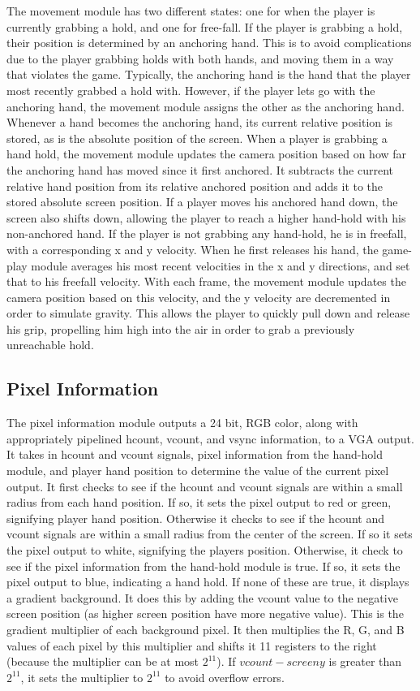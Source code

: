 The movement module has two different states: one for when the player is
currently grabbing a hold, and one for free-fall. If the player is grabbing a
hold, their position is determined by an anchoring hand. This is to avoid
complications due to the player grabbing holds with both hands, and moving them
in a way that violates the game. Typically, the anchoring hand is the hand that
the player most recently grabbed a hold with. However, if the player lets go
with the anchoring hand, the movement module assigns the other as the anchoring
hand. Whenever a hand becomes the anchoring hand, its current relative position
is stored, as is the absolute position of the screen. When a player is grabbing
a hand hold, the movement module updates the camera position based on how far
the anchoring hand has moved since it first anchored. It subtracts the current
relative hand position from its relative anchored position and adds it to the
stored absolute screen position. If a player moves his anchored hand down, the
screen also shifts down, allowing the player to reach a higher hand-hold with
his non-anchored hand. If the player is not grabbing any hand-hold, he is in
freefall, with a corresponding x and y velocity. When he first releases his
hand, the game-play module averages his most recent velocities in the x and y
directions, and set that to his freefall velocity. With each frame, the movement
module updates the camera position based on this velocity, and the y velocity
are decremented in order to simulate gravity. This allows the player to quickly
pull down and release his grip, propelling him high into the air in order to
grab a previously unreachable hold.

\subsection{Pixel Information}

The pixel information module outputs a 24 bit, RGB color, along with
appropriately pipelined hcount, vcount, and vsync information, to a VGA output.
It takes in hcount and vcount signals, pixel information from the hand-hold
module, and player hand position to determine the value of the current pixel
output. It first checks to see if the hcount and vcount signals are within a
small radius from each hand position. If so, it sets the pixel output to red or
green, signifying player hand position. Otherwise it checks to see if the hcount
and vcount signals are within a small radius from the center of the screen. If
so it sets the pixel output to white, signifying the players position.
Otherwise, it check to see if the pixel information from the hand-hold module is
true. If so, it sets the pixel output to blue, indicating a hand hold. If none
of these are true, it displays a gradient background. It does this by adding the
vcount value to the negative screen position (as higher screen position have
more negative value). This is the gradient multiplier of each background pixel.
It then multiplies the R, G, and B values of each pixel by this multiplier and
shifts it 11 registers to the right (because the multiplier can be at most $2
^{11}$). If $vcount - screeny$ is greater than $2^{11}$, it sets the multiplier to
$2^{11}$ to avoid overflow errors.
